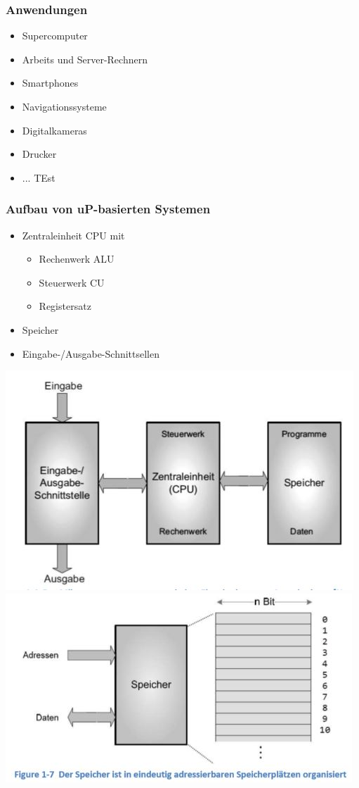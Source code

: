 \begin{multicols}{2}
\subsubsection{Anwendungen}
\begin{minipage}{\linewidth}
\begin{itemize}
    \item Supercomputer
    \item Arbeits und Server-Rechnern
    \item Smartphones
    \item Navigationssysteme
    \item Digitalkameras
    \item Drucker
    \item ... TEst
\end{itemize}
\end{minipage}

\begin{minipage}{\linewidth}
\subsubsection{Aufbau von uP-basierten Systemen}
\begin{itemize}
    \item Zentraleinheit CPU mit
    \begin{itemize}
        \item Rechenwerk ALU
        \item Steuerwerk CU
        \item Registersatz
    \end{itemize}
    \item Speicher
    \item Eingabe-/Ausgabe-Schnittsellen
\end{itemize}
\end{minipage}
\end{multicols}

\includegraphics[width=0.5\linewidth]{images/aufbauuC1}
\includegraphics[width=0.5\linewidth]{images/aufbauuCspeicher}


